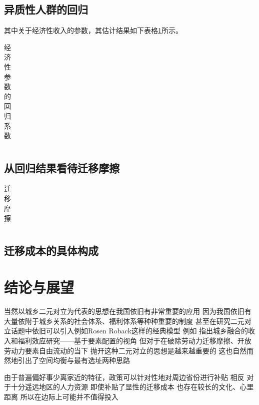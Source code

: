 \documentclass[a4paper,12pt,oneside, fontset=mac]{ctexbook} %
\begin{document}
\section{异质性人群的回归} 

其中关于经济性收入的参数，其估计结果如下表格\ref{tab:经济性参数的回归系数}所示。
\begin{table}[!ht]
\centering
\caption{经济性参数的回归系数}
\begin{tabularx}{\textwidth}{@{}cXXX@{}}
\toprule
\midrule
\bottomrule
\end{tabularx}
\label{tab:经济性参数的回归系数}
\end{table}


\section{从回归结果看待迁移摩擦}


\begin{table}[!ht]
\centering
\caption{迁移摩擦}
\begin{tabularx}{\textwidth}{@{}cXXX@{}}
\toprule
\midrule
\bottomrule
\end{tabularx}
\label{tab:迁移摩擦}
\end{table}



\section{迁移成本的具体构成}






\chapter{结论与展望}

当然以城乡二元对立为代表的思想在我国依旧有非常重要的应用 因为我国依旧有大量依附于城乡关系的社会体系、福利体系等种种重要的制度
甚至在研究二元对立话题中依旧可以引入例如Rosen Roback这样的经典模型
例如 
\cite{GuoDongMeiChengXiangRongHeDeShouRuHeFuLiXiaoYingYanJiuJiYuYaoSuPeiZhiDeShiJiao2023}指出城乡融合的收入和福利效应研究——基于要素配置的视角
但对于在破除劳动力迁移摩擦、开放劳动力要素自由流动的当下
抛开这种二元对立的思想是越来越重要的
这也自然而然地引出了空间均衡与最有选址两种思路



由于普遍偏好事少离家近的特征，政策可以针对性地对周边省份进行补贴
相反 对于十分遥远地区的人力资源 即使补贴了显性的迁移成本 也存在较长的文化、心里距离 所以在边际上可能并不值得投入
\end{document}
